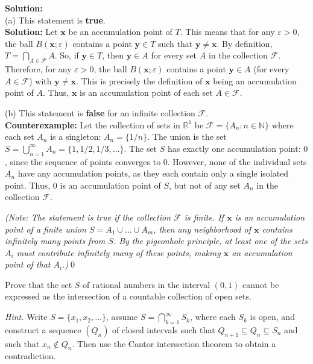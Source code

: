 \bigskip\noindent\textbf{Solution:}\\
(a) This statement is \textbf{true}.\\
\bigskip\noindent\textbf{Solution:} Let $\mathbf{x}$ be an accumulation point of $T$. This means that for any $\varepsilon > 0$, the ball $B(\mathbf{x}; \varepsilon)$ contains a point $\mathbf{y} \in T$ such that $\mathbf{y} \neq \mathbf{x}$. By definition, $T = \bigcap_{A \in \mathcal{F}} A$. So, if $\mathbf{y} \in T$, then $\mathbf{y} \in A$ for every set $A$ in the collection $\mathcal{F}$. Therefore, for any $\varepsilon > 0$, the ball $B(\mathbf{x}; \varepsilon)$ contains a point $\mathbf{y} \in A$ (for every $A \in \mathcal{F}$) with $\mathbf{y} \neq \mathbf{x}$. This is precisely the definition of $\mathbf{x}$ being an accumulation point of $A$. Thus, $\mathbf{x}$ is an accumulation point of each set $A \in \mathcal{F}$.

(b) This statement is \textbf{false} for an infinite collection $\mathcal{F}$.\\
\textbf{Counterexample:} Let the collection of sets in $\mathbb{R}^1$ be $\mathcal{F} = \{A_n : n \in \mathbb{N}\}$ where each set $A_n$ is a singleton: $A_n = \{1/n\}$.
The union is the set $S = \bigcup_{n=1}^{\infty} A_n = \{1, 1/2, 1/3, \dots\}$.
The set $S$ has exactly one accumulation point: $0$, since the sequence of points converges to $0$.
However, none of the individual sets $A_n$ have any accumulation points, as they each contain only a single isolated point.
Thus, $0$ is an accumulation point of $S$, but not of any set $A_n$ in the collection $\mathcal{F}$.

\textit{(Note: The statement is true if the collection $\mathcal{F}$ is finite. If $\mathbf{x}$ is an accumulation point of a finite union $S = A_1 \cup \dots \cup A_m$, then any neighborhood of $\mathbf{x}$ contains infinitely many points from $S$. By the pigeonhole principle, at least one of the sets $A_i$ must contribute infinitely many of these points, making $\mathbf{x}$ an accumulation point of that $A_i$.)}\qed


\begin{problembox}
\begin{problemstatement}
Prove that the set \( S \) of rational numbers in the interval \( (0, 1) \) cannot be expressed as the intersection of a countable collection of open sets. 

\textit{Hint.} Write \( S = \{x_1, x_2, \ldots\} \), assume \( S = \bigcap_{k=1}^{\infty} S_k \), where each \( S_k \) is open, and construct a sequence \( (Q_n) \) of closed intervals such that \( Q_{n+1} \subseteq Q_n \subseteq S_n \) and such that \( x_n \notin Q_n \). Then use the Cantor intersection theorem to obtain a contradiction.
\end{problemstatement}
\end{problembox}

